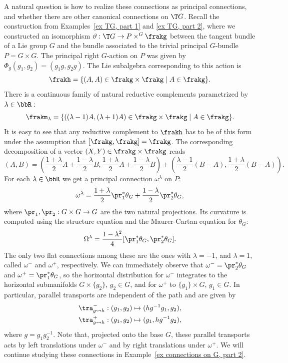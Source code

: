\begin{example}
    A natural question is how to realize these connections as principal connections, and whether there are other canonical connections on $\T G$. Recall the construction from Examples~\ref{ex TG, part 1} and \ref{ex TG, part 2}, where we constructed an isomorphism $\vartheta:\T G\to P\times^G \frakg$ between the tangent bundle of a Lie group $G$ and the bundle associated to the trivial principal $G$-bundle $P=G\times G$. The principal right $G$-action on $P$ was given by $\Phi_g(g_1,g_2)=(g_1g,g_2g)$. The Lie subalgebra corresponding to this action is
    \[\frakh=\{(A,A)\in \frakg\times\frakg\mid A\in\frakg\}.\]
    There is a continuous family of natural reductive complements parametrized by $\lambda\in\bbR:$
    \[\frakm_\lambda=\{((\lambda-1)A,(\lambda+1)A)\in \frakg\times\frakg\mid A\in\frakg\}.\] 
    It is easy to see that any reductive complement to $\frakh$ has to be of this form under the assumption that $[\frakg,\frakg]=\frakg$. The corresponding decomposition of a vector $(X,Y)\in\frakg\times\frakg$ reads
    \[(A,B)=\left(\frac{1+\lambda}{2}A+\frac{1-\lambda}{2}B,\frac{1+\lambda}{2}A+\frac{1-\lambda}{2}B\right)+\left(\frac{\lambda-1}{2}(B-A),\frac{1+\lambda}{2}(B-A)\right).\]
    For each $\lambda\in\bbR$ we get a principal connection $\omega^\lambda$ on $P$:
    \[\omega^\lambda=\frac{1+\lambda}{2}\pr_1^\ast \theta_G+\frac{1-\lambda}{2}\pr_2^\ast \theta_G,\]
    where $\pr_1,\pr_2:G\times G\to G$ are the two natural projections. Its curvature is computed using the structure equation and the Maurer-Cartan equation for $\theta_G$:
    \[\Omega^\lambda=\frac{1-\lambda^2}{4}[\pr_1^\ast \theta_G,\pr_2^\ast\theta_G].\]
    The only two flat connections among these are the ones with $\lambda=-1$, and $\lambda=1$, called $\omega^-$ and $\omega^+$, respectively. We can immediately observe that $\omega^-=\pr_2^\ast\theta_G$ and $\omega^+=\pr_1^\ast\theta_G$, so the horizontal distribution for $\omega^-$ integrates to the horizontal submanifolds $G\times\{g_2\}$, $g_2\in G$, and for $\omega^+$ to $\{g_1\}\times G$, $g_1\in G$. In particular, parallel transports are independent of the path and are given by
    \begin{align}
        \tra^-_{g\leadsto h}: (g_1,g_2)\mapsto (hg^{-1}g_1,g_2),\\
        \tra^+_{g\leadsto h}: (g_1,g_2)\mapsto (g_1,hg^{-1}g_2),
    \end{align}
    where $g=g_1g_2^{-1}$. Note that, projected onto the base $G$, these parallel transports acts by left translations under $\omega^-$ and by right translations under $\omega^+$.
    We will continue studying these connections in Example~\ref{ex connections on G, part 2}.
\end{example}










